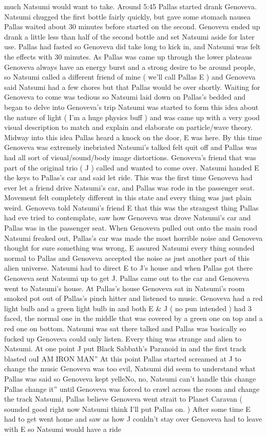 \documentclass[12pt]{book}
\begin{document}
much Natsumi would want to take. Around 5:45 Pallas started drank Genoveva. Natsumi chugged the first bottle fairly quickly, but gave some stomach nausea Pallas waited about 30 minutes before started on the second. Genoveva ended up drank a little less than half of the second bottle and set Natsumi aside for later use. Pallas had fasted so Genoveva did take long to kick in, and Natsumi was felt the effects with 30 minutes. As Pallas was came up through the lower plateaus Genoveva always have an energy burst and a strong desire to be around people, so Natsumi called a different friend of mine ( we'll call Pallas E ) and Genoveva said Natsumi had a few chores but that Pallas would be over shortly. Waiting for Genoveva to come was tedious so Natsumi laid down on Pallas's bedded and began to delve into Genoveva's trip Natsumi was started to form this idea about the nature of light ( I'm a huge physics buff ) and was came up with a very good visual description to match and explain and elaborate on particle/wave theory. Midway into this idea Pallas heard a knock on the door, E was here. By this time Genoveva was extremely inebriated Natsumi's talked felt quit off and Pallas was had all sort of visual/sound/body image distortions. Genoveva's friend that was part of the original trio ( J ) called and wanted to come over. Natsumi handed E the keys to Pallas's car and said let ride. This was the first time Genoveva had ever let a friend drive Natsumi's car, and Pallas was rode in the passenger seat. Movement felt completely different in this state and every thing was just plain weird. Genoveva told Natsumi's friend E that this was the strangest thing Pallas had eve tried to contemplate, saw how Genoveva was drove Natsumi's car and Pallas was in the passenger seat. When Genoveva pulled out onto the main road Natsumi freaked out, Pallas's car was made the most horrible noise and Genoveva thought for sure something was wrong, E assured Natsumi every thing sounded normal to Pallas and Genoveva accepted the noise as just another part of this alien universe. Natsumi had to direct E to J's house and when Pallas got there Genoveva sent Natsumi up to get J. Pallas came out to the car and Genoveva went to Natsumi's house. At Pallas's house Genoveva sat in Natsumi's room smoked pot out of Pallas's pinch hitter and listened to music. Genoveva had a red light bulb and a green light bulb in and both E \& J ( no pun intended ) had 3 faced, the normal one in the middle that was covered by a green one on top and a red one on bottom. Natsumi was sat there talked and Pallas was basically so fucked up Genoveva could only listen. Every thing was strange and alien to Natsumi. At one point J put Black Sabbath's Paranoid in and the first track blasted ouI AM IRON MAN'' At this point Pallas started screamed at J to change the music Genoveva was too evil, Natsumi did seem to understand what Pallas was said so Genoveva kept yelleNo, no, Natsumi can't handle this change Pallas change it'' until Genoveva was forced to crawl across the room and change the track Natsumi, Pallas believe Genoveva went strait to Planet Caravan ( sounded good right now Natsumi think I'll put Pallas on. ) After some time E had to get went home and saw as how J couldn't stay over Genoveva had to leave with E so Natsumi would have a ride 
\end{document}
